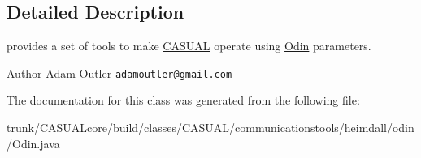 \subsection{Detailed Description}
provides a set of tools to make \hyperlink{namespace_c_a_s_u_a_l}{C\-A\-S\-U\-A\-L} operate using \hyperlink{class_c_a_s_u_a_l_1_1communicationstools_1_1heimdall_1_1odin_1_1_odin}{Odin} parameters.

\begin{DoxyAuthor}{Author}
Adam Outler \href{mailto:adamoutler@gmail.com}{\tt adamoutler@gmail.\-com} 
\end{DoxyAuthor}


The documentation for this class was generated from the following file\-:\begin{DoxyCompactItemize}
\item 
trunk/\-C\-A\-S\-U\-A\-Lcore/build/classes/\-C\-A\-S\-U\-A\-L/communicationstools/heimdall/odin/Odin.\-java\end{DoxyCompactItemize}
